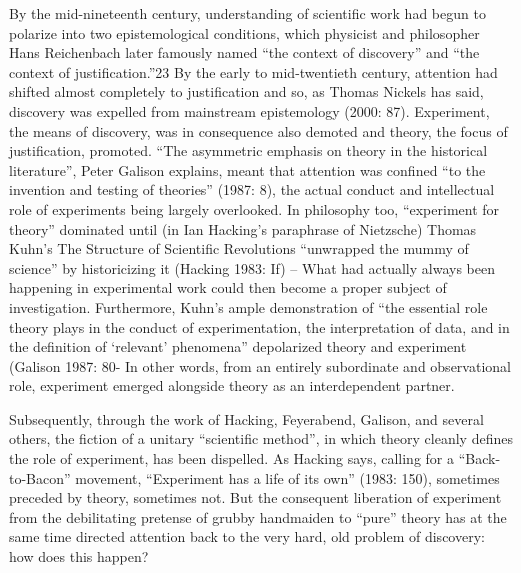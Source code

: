 By the mid-nineteenth century, understanding of scientific work had
begun to polarize into two epistemological conditions, which physicist
and philosopher Hans Reichenbach later famously named ``the context of
discovery'' and ``the context of justification.''23 By the early to
mid-twentieth century, attention had shifted almost completely to
justification and so, as Thomas Nickels has said, discovery was expelled
from mainstream epistemology (2000: 87). Experiment, the means of
discovery, was in consequence also demoted and theory, the focus of
justification, promoted. ``The asymmetric emphasis on theory in the
historical literature'', Peter Galison explains, meant that attention
was confined ``to the invention and testing of theories'' (1987: 8), the
actual conduct and intellectual role of experiments being largely
overlooked. In philosophy too, ``experiment for theory'' dominated until
(in Ian Hacking's paraphrase of Nietzsche) Thomas Kuhn's The Structure
of Scientific Revolutions ``unwrapped the mummy of science'' by
historicizing it (Hacking 1983: If) -- What had actually always been
happening in experimental work could then become a proper subject of
investigation. Furthermore, Kuhn's ample demonstration of ``the
essential role theory plays in the conduct of experimentation, the
interpretation of data, and in the definition of `relevant' phenomena''
depolarized theory and experiment (Galison 1987: 80- In other words,
from an entirely subordinate and observational role, experiment emerged
alongside theory as an interdependent partner.

Subsequently, through the work of Hacking, Feyerabend, Galison, and
several others, the fiction of a unitary ``scientific method'', in which
theory cleanly defines the role of experiment, has been dispelled. As
Hacking says, calling for a ``Back-to-Bacon'' movement, ``Experiment has
a life of its own'' (1983: 150), sometimes preceded by theory, sometimes
not. But the consequent liberation of experiment from the debilitating
pretense of grubby handmaiden to ``pure'' theory has at the same time
directed attention back to the very hard, old problem of discovery: how
does this happen?

